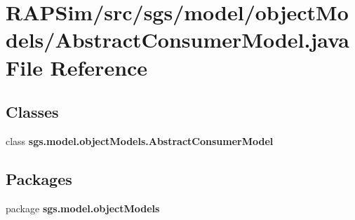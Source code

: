 \section{R\-A\-P\-Sim/src/sgs/model/object\-Models/\-Abstract\-Consumer\-Model.java File Reference}
\label{_abstract_consumer_model_8java}
\subsection*{Classes}
\begin{DoxyCompactItemize}
\item 
class {\bf sgs.\-model.\-object\-Models.\-Abstract\-Consumer\-Model}
\end{DoxyCompactItemize}
\subsection*{Packages}
\begin{DoxyCompactItemize}
\item 
package {\bf sgs.\-model.\-object\-Models}
\end{DoxyCompactItemize}
